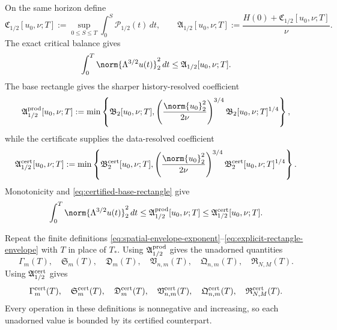 On the same horizon define
\begin{equation}
 \mathfrak C_{1/2}[u_0,\nu;T]
 :=\sup_{0\le S\le T}\int_0^S\mathcal P_{1/2}(t)\,dt,
 \qquad
 \mathfrak A_{1/2}[u_0,\nu;T]
 :=\frac{H(0)+\mathfrak C_{1/2}[u_0,\nu;T]}{\nu}.
 \label{eq:global-critical-current-values}
\end{equation}
The exact critical balance gives
\begin{equation}
 \int_0^T\norm{\Lambda^{3/2}u(t)}_2^2\,dt
 \le\mathfrak A_{1/2}[u_0,\nu;T].
 \label{eq:global-critical-coefficient-value}
\end{equation}
The base rectangle gives the sharper history-resolved coefficient
\begin{equation}
 \mathfrak A_{1/2}^{\rm prod}[u_0,\nu;T]
 :=\min\left\{
 \mathfrak B_2[u_0,\nu;T],
 \left(\frac{\norm{u_0}_2^2}{2\nu}\right)^{3/4}
 \mathfrak B_2[u_0,\nu;T]^{1/4}
 \right\},
 \label{eq:global-producer-critical-coefficient}
\end{equation}
while the certificate supplies the data-resolved coefficient
\begin{equation}
 \mathfrak A_{1/2}^{\rm cert}[u_0,\nu;T]
 :=\min\left\{
 \mathfrak B_2^{\rm cert}[u_0,\nu;T],
 \left(\frac{\norm{u_0}_2^2}{2\nu}\right)^{3/4}
 \mathfrak B_2^{\rm cert}[u_0,\nu;T]^{1/4}
 \right\}.
 \label{eq:global-certified-critical-coefficient}
\end{equation}
Monotonicity and \eqref{eq:certified-base-rectangle} give
\begin{equation}
 \int_0^T\norm{\Lambda^{3/2}u(t)}_2^2\,dt
 \le\mathfrak A_{1/2}^{\rm prod}[u_0,\nu;T]
 \le\mathfrak A_{1/2}^{\rm cert}[u_0,\nu;T].
 \label{eq:global-producer-critical-coefficient-bound}
\end{equation}

Repeat the finite definitions
\eqref{eq:spatial-envelope-exponent}--\eqref{eq:explicit-rectangle-envelope}
with \(T\) in place of \(T_*\).  Using
\(\mathfrak A_{1/2}^{\rm prod}\) gives the unadorned quantities
\[
 \Gamma_m(T),\quad
 \mathfrak S_m(T),\quad
 \mathfrak D_m(T),\quad
 \mathfrak V_{n,m}(T),\quad
 \mathfrak Q_{n,m}(T),\quad
 \mathfrak R_{N,M}(T).
\]
Using \(\mathfrak A_{1/2}^{\rm cert}\) gives
\[
 \Gamma_m^{\rm cert}(T),\quad
 \mathfrak S_m^{\rm cert}(T),\quad
 \mathfrak D_m^{\rm cert}(T),\quad
 \mathfrak V_{n,m}^{\rm cert}(T),\quad
 \mathfrak Q_{n,m}^{\rm cert}(T),\quad
 \mathfrak R_{N,M}^{\rm cert}(T).
\]
Every operation in these definitions is nonnegative and increasing, so each
unadorned value is bounded by its certified counterpart.

